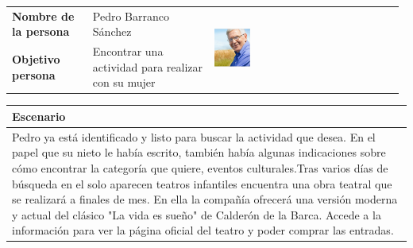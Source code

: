 \documentclass[11pt]{article}
\begin{document}
\begin{table}[H]
	\centering
	\begin{tabular}{p{0.2\linewidth}|p{0.3\linewidth}p{0.475\linewidth}}
		\toprule
		\textbf{Nombre de la persona} & Pedro Barranco Sánchez &\multirow{2}{*}{\begin{minipage}{1.\textwidth}\includegraphics[width=0.2\textwidth, height=25mm]{Pedro}\end{minipage}}\\
		\textbf{Objetivo persona} & Encontrar una actividad para realizar con su mujer & \\
		\bottomrule
	\end{tabular}
	
	\begin{tabular}{p{1.028\linewidth}}
		\textbf{Escenario}\\
		\midrule
		Pedro ya está identificado y listo para buscar la actividad que desea. En el papel que su nieto le había escrito, también había algunas indicaciones sobre cómo encontrar la categoría que quiere, eventos culturales.Tras varios días de búsqueda en el solo aparecen teatros infantiles encuentra una obra teatral que se realizará a finales de mes. En ella la compañía ofrecerá una versión moderna y actual del clásico "La vida es sueño" de Calderón de la Barca. Accede a la información para ver la página oficial del teatro y poder comprar las entradas.
		
	\end{tabular}
\end{table}
\end{document}
